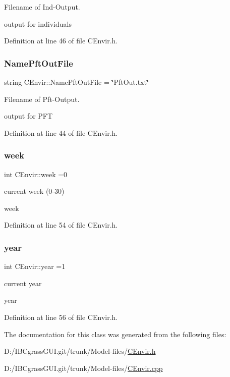 Filename of Ind-\/\+Output. 

output for individuals 

Definition at line 46 of file C\+Envir.\+h.

\mbox{\label{class_c_envir_aabd557ac751d71e57f93b02b429d2386}} 
\subsubsection{\texorpdfstring{NamePftOutFile}{NamePftOutFile}}
{\footnotesize\ttfamily string C\+Envir\+::\+Name\+Pft\+Out\+File = \char`\"{}Pft\+Out.\+txt\char`\"{}\hspace{0.3cm}{\ttfamily [static]}}



Filename of Pft-\/\+Output. 

output for P\+FT 

Definition at line 44 of file C\+Envir.\+h.

\mbox{\label{class_c_envir_a947969beb1b553371357e2ebf51b5234}} 
\subsubsection{\texorpdfstring{week}{week}}
{\footnotesize\ttfamily int C\+Envir\+::week =0\hspace{0.3cm}{\ttfamily [static]}}



current week (0-\/30) 

week 

Definition at line 54 of file C\+Envir.\+h.

\mbox{\label{class_c_envir_ae5d7965547f76a4a9191e85e953737e6}} 
\subsubsection{\texorpdfstring{year}{year}}
{\footnotesize\ttfamily int C\+Envir\+::year =1\hspace{0.3cm}{\ttfamily [static]}}



current year 

year 

Definition at line 56 of file C\+Envir.\+h.



The documentation for this class was generated from the following files\+:\begin{DoxyCompactItemize}
\item 
D\+:/\+I\+B\+Cgrass\+G\+U\+I.\+git/trunk/\+Model-\/files/\mbox{\hyperlink{_c_envir_8h}{C\+Envir.\+h}}\item 
D\+:/\+I\+B\+Cgrass\+G\+U\+I.\+git/trunk/\+Model-\/files/\mbox{\hyperlink{_c_envir_8cpp}{C\+Envir.\+cpp}}\end{DoxyCompactItemize}
